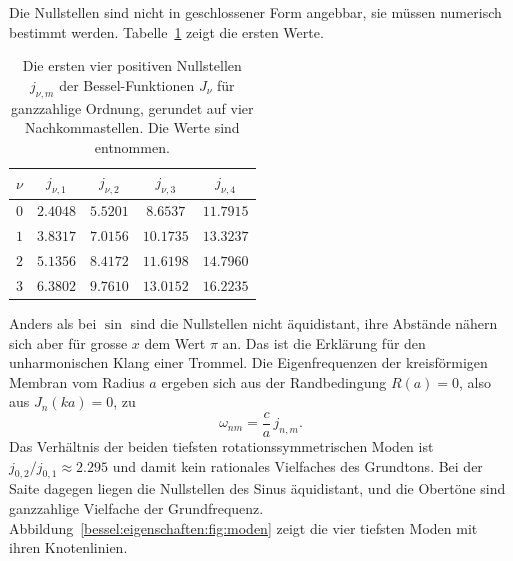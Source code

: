 Die Nullstellen sind nicht in geschlossener Form angebbar, sie müssen numerisch bestimmt werden.
Tabelle~\ref{bessel:eigenschaften:tab:nullstellen} zeigt die ersten Werte.

\begin{table}
\centering
\caption{Die ersten vier positiven Nullstellen $j_{\nu,m}$ der Bessel-Funktionen $J_\nu$ für ganzzahlige Ordnung, gerundet auf vier Nachkommastellen.
Die Werte sind \cite[Abschnitt~9.5]{bessel:abramowitz} entnommen.
\label{bessel:eigenschaften:tab:nullstellen}}
\begin{tabular}{c|cccc}
$\nu$ & $j_{\nu,1}$ & $j_{\nu,2}$ & $j_{\nu,3}$ & $j_{\nu,4}$ \\
\hline
$0$ & $2.4048$ & $5.5201$ & $8.6537$ & $11.7915$ \\
$1$ & $3.8317$ & $7.0156$ & $10.1735$ & $13.3237$ \\
$2$ & $5.1356$ & $8.4172$ & $11.6198$ & $14.7960$ \\
$3$ & $6.3802$ & $9.7610$ & $13.0152$ & $16.2235$
\end{tabular}
\end{table}
 
Anders als bei $\sin$ sind die Nullstellen nicht äquidistant, ihre Abstände nähern sich aber für grosse $x$ dem Wert $\pi$ an.
Das ist die Erklärung für den unharmonischen Klang einer Trommel.
Die Eigenfrequenzen der kreisförmigen Membran vom Radius $a$ ergeben sich aus der Randbedingung $R(a)=0$, also aus $J_n(ka)=0$, zu
\begin{equation}
\omega_{nm}
=
\frac{c}{a}\, j_{n,m}.
\label{bessel:eigenschaften:eqn:eigenfrequenzen}
\end{equation}
Das Verhältnis der beiden tiefsten rotationssymmetrischen Moden ist $j_{0,2}/j_{0,1}\approx 2.295$ und damit kein rationales Vielfaches des Grundtons.
Bei der Saite dagegen liegen die Nullstellen des Sinus äquidistant, und die Obertöne sind ganzzahlige Vielfache der Grundfrequenz.
Abbildung~\ref{bessel:eigenschaften:fig:moden} zeigt die vier tiefsten Moden mit ihren Knotenlinien.

